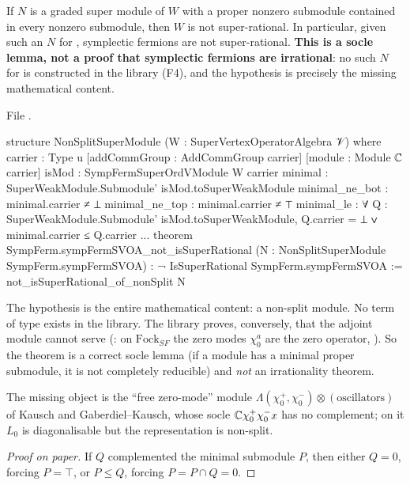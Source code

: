 \begin{theorem}\label{l17:thm:sfirrat}
If $N$ is a graded super module of $W$ with a proper nonzero submodule contained in every nonzero
submodule, then $W$ is not super-rational. In particular, given such an $N$ for
, symplectic fermions are not super-rational. \textbf{This is a socle lemma, not
a proof that symplectic fermions are irrational}: no such $N$ for  is constructed
in the library (F4), and the hypothesis is precisely the missing mathematical content.
\end{theorem}
\noindent File .
\begin{leancode}
structure NonSplitSuperModule (W : SuperVertexOperatorAlgebra 𝒱) where
  carrier : Type u
  [addCommGroup : AddCommGroup carrier]
  [module : Module ℂ carrier]
  isMod : SympFermSuperOrdVModule W carrier
  minimal : SuperWeakModule.Submodule' isMod.toSuperWeakModule
  minimal_ne_bot : minimal.carrier ≠ ⊥
  minimal_ne_top : minimal.carrier ≠ ⊤
  minimal_le : ∀ Q : SuperWeakModule.Submodule' isMod.toSuperWeakModule,
    Q.carrier = ⊥ ∨ minimal.carrier ≤ Q.carrier
...
theorem SympFerm.sympFermSVOA_not_isSuperRational
    (N : NonSplitSuperModule SympFerm.sympFermSVOA) : ¬ IsSuperRational SympFerm.sympFermSVOA :=
  not_isSuperRational_of_nonSplit N
\end{leancode}
\begin{dictionary}
The hypothesis  is the entire mathematical content: a non-split module. No term of type
 exists in the library. The library proves, conversely, that the
adjoint module cannot serve (: on $\mathrm{Fock}_{SF}$ the zero
modes $\chi^a_0$ are the zero operator, ). So the theorem is a correct
socle lemma (if a module has a minimal proper submodule, it is not completely reducible) and
\emph{not} an irrationality theorem.
\end{dictionary}
\begin{physics}
The missing object is the ``free zero-mode'' module $\Lambda(\chi^+_0,\chi^-_0)\otimes(\text{oscillators})$
of Kausch and Gaberdiel--Kausch, whose socle ${\mathbb{C}}\chi^+_0\chi^-_0x$ has no complement; on it $L_0$
is diagonalisable but the representation is non-split.
\end{physics}
\begin{proof}[Proof on paper]
If $Q$ complemented the minimal submodule $P$, then either $Q=0$, forcing $P=\top$, or $P\le Q$,
forcing $P=P\cap Q=0$.
\end{proof}
